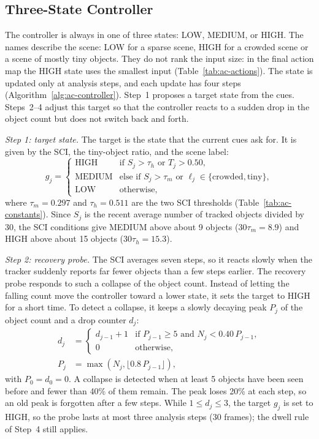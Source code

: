 \subsection{Three-State Controller}\label{sec:ac-states}
The controller is always in one of three states: LOW, MEDIUM, or HIGH. The names describe the scene: LOW for a sparse scene, HIGH for a crowded scene or a scene of mostly tiny objects. They do not rank the input size: in the final action map the HIGH state uses the smallest input (Table~\ref{tab:ac-actions}). The state is updated only at analysis steps, and each update has four steps (Algorithm~\ref{alg:ac-controller}). Step~1 proposes a target state from the cues. Steps~2--4 adjust this target so that the controller reacts to a sudden drop in the object count but does not switch back and forth.

\emph{Step 1: target state.} The target is the state that the current cues ask for. It is given by the SCI, the tiny-object ratio, and the scene label:
\begin{equation}
g_j=\begin{cases}
\text{HIGH}   & \text{if } S_j>\tau_h \text{ or } T_j>0.50,\\
\text{MEDIUM} & \text{else if } S_j>\tau_m \text{ or } \ell_j\in\{\text{crowded},\text{tiny}\},\\
\text{LOW}    & \text{otherwise,}
\end{cases}
\label{eq:ac-target}
\end{equation}
where $\tau_m=0.297$ and $\tau_h=0.511$ are the two SCI thresholds (Table~\ref{tab:ac-constants}). Since $S_j$ is the recent average number of tracked objects divided by 30, the SCI conditions give MEDIUM above about 9 objects ($30\tau_m=8.9$) and HIGH above about 15 objects ($30\tau_h=15.3$).

\emph{Step 2: recovery probe.} The SCI averages seven steps, so it reacts slowly when the tracker suddenly reports far fewer objects than a few steps earlier. The recovery probe responds to such a collapse of the object count. Instead of letting the falling count move the controller toward a lower state, it sets the target to HIGH for a short time. To detect a collapse, it keeps a slowly decaying peak $P_j$ of the object count and a drop counter $d_j$:
\begin{align}
d_j&=\begin{cases}
d_{j-1}+1 & \text{if } P_{j-1}\ge5 \text{ and } N_j<0.40\,P_{j-1},\\
0         & \text{otherwise,}
\end{cases}\label{eq:ac-drop}\\
P_j&=\max\left(N_j,\lfloor 0.8\,P_{j-1}\rfloor\right),\label{eq:ac-peak}
\end{align}
with $P_0=d_0=0$. A collapse is detected when at least 5 objects have been seen before and fewer than 40\% of them remain. The peak loses 20\% at each step, so an old peak is forgotten after a few steps. While $1\le d_j\le3$, the target $g_j$ is set to HIGH, so the probe lasts at most three analysis steps (30 frames); the dwell rule of Step~4 still applies.

